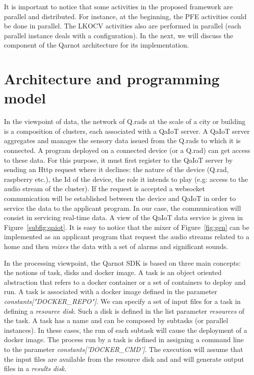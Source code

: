 \documentclass[10pt, conference, compsocconf]{IEEEtran}
\begin{document}
It is important to notice that some activities in the proposed framework are parallel and distributed. For instance, at the beginning, 
the PFE activities could be done in parallel. The LKOCV activities also are performed in parallel (each parallel instance deals  
with a configuration). In the next, we will discuss the component of the Qarnot architecture for 
its implementation.

\section{Architecture and programming model} \label{Model}

In the viewpoint of data, the network of Q.rads at the scale of a city or building is a composition of clusters, each 
associated with a QaIoT server. A QaIoT server aggregates and manages the sensory data issued from the Q.rads to which it is 
connected. A program deployed on a connected device (or a Q.rad) can get access to these data. For this purpose, 
it must first register to the QaIoT server by sending an Http request where it declines: the nature of the device (Q.rad, 
raspberry etc.), the Id of the device, the role it intends to play (e.g: access to the audio stream of the cluster). If the 
request is accepted a websocket communication will be established between the device and QaIoT in order to service the data
to the applicant program. In our case, the communication will consist in servicing real-time data.
A view of the QaIoT data service is given in Figure~\ref{subfig:qaiot}. 
It is easy to notice that the mixer of Figure~\ref{fig:gen} can be implemented as an applicant program that request the audio streams  
related to a home and then {\it mixes} the data with a set of alarms and significant sounds.

In the processing viewpoint, the Qarnot SDK is based on three main concepts: the notions of task, 
disks and docker image. A task is an object oriented abstraction that refers to a 
docker container or a set of containers to deploy and run. A task is associated with a docker image defined in the 
parameter {\it constants["DOCKER\_REPO"]}. We can specify a set of input files for a task in defining a {\it resource disk}. 
Such a disk is defined in the list parameter {\it resources} of the task. 
A task has a name and can be composed by subtasks (or parallel instances).  
In these cases, the run of each subtask will cause the deployment of a docker image. The process run by a task is defined in 
assigning a command line to the parameter {\it constants['DOCKER\_CMD']}. The execution will assume that the input 
files are available from the resource disk and and will generate output files in a {\it results disk}.
\end{document}
